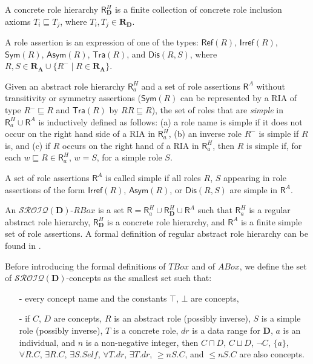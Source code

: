 \documentclass[a4paper]{llncs}
\newcommand{\sroiqd}{\ensuremath{\mathcal{SROIQ}(\D)}}
\newcommand{\D}{\mathbf{D}}
\newcommand{\Ra}{\mathbf{R_A}}
\newcommand{\Rd}{\mathbf{R_D}}
\newcommand{\sym}{\mathsf{Sym}}
\newcommand{\asym}{\mathsf{Asym}}
\newcommand{\refl}{\mathsf{Ref}}
\newcommand{\irref}{\mathsf{Irref}}
\newcommand{\tra}{\mathsf{Tra}}
\begin{document}
A concrete role hierarchy $\mathsf{R}_{\D}^{H}$ is a finite collection of concrete role inclusion axioms $T_i \sqsubseteq T_j$, where $T_i, T_j \in \Rd$.

A role assertion is an expression of one of the types: $\refl(R)$, $\irref(R)$, $\sym(R)$, $\asym(R)$, $\tra(R)$, and $\mathsf{Dis}(R,S)$, where $R,S \in \Ra \cup \{ R^- \mid R \in \Ra \}$.






Given an abstract role hierarchy $\mathsf{R}_{a}^{H}$ and a set of role assertions $\mathsf{R}^{A}$ without transitivity or symmetry assertions ($\sym(R)$ can be represented by a RIA of type $R^- \sqsubseteq R$ and $\tra(R)$ by $RR\sqsubseteq R$), the set of roles that are \emph{simple} in $\mathsf{R}_{a}^{H} \cup \mathsf{R}^{A}$ is inductively defined as follows: (a)
a role name is simple if it does not occur on the right hand side of a RIA in $\mathsf{R}_{a}^{H}$,
(b) an inverse role $R^-$ is simple if $R$ is, and
(c) if $R$ occurs on the right hand of a RIA in $\mathsf{R}_{a}^{H}$, then $R$ is simple if, for each $w \sqsubseteq R \in \mathsf{R}_{a}^{H}$,  $w=S$, for a simple role $S$.


A set of role assertions $\mathsf{R}^{A}$ is called simple if all roles $R$, $S$ appearing in role assertions of the form $\irref(R)$, $\asym(R)$, or $\mathsf{Dis}(R,S)$ are simple in $\mathsf{R}^{A}$.





An \sroiqd-$RBox$ is a set $\mathsf{R} = \mathsf{R}_{a}^{H} \cup \mathsf{R}_{\D}^{H} \cup \mathsf{R}^{A}$ such that $\mathsf{R}_{a}^{H}$ is a regular abstract role hierarchy, $\mathsf{R}_{\D}^{H}$ is a concrete role hierarchy, and $\mathsf{R}^{A}$ is a finite simple set of role assertions. A formal definition of regular abstract role hierarchy can be found in \cite{Horrocks2006}.

Before introducing the formal definitions of $TBox$ and of $ABox$, we define the set of \sroiqd-concepts as the smallest set such that:
\begin{itemize}
\item[-]{every concept name and the constants $\top$, $\bot$ are concepts,}
\item[-]{if $C$, $D$ are concepts, $R$ is an abstract role (possibly inverse), $S$ is a simple role (possibly inverse), $T$ is a concrete role, $dr$ is a data range for $\D$, $a$ is an individual, and $n$ is a non-negative integer, then $C \sqcap D$, $C \sqcup D$, $\neg C$, $\{a\}$, $\forall R.C$, $\exists R.C$, $\exists S.\mathit{Self}$, $\forall T.dr$, $\exists T.dr$, $\geq nS.C$, and $\leq n S.C$ are also concepts.}
\end{itemize}
\end{document}
